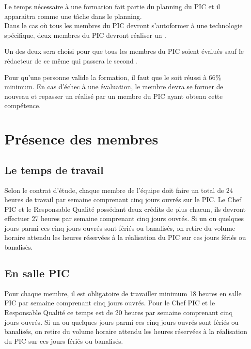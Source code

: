 Le temps nécessaire à une formation fait partie du planning du PIC et il apparaitra comme une tâche dans le planning. \\

Dans le cas où tous les membres du PIC devront s'autoformer à une technologie spécifique, deux membres du PIC devront réaliser un \QCM.

Un des deux \QCMCourt{} sera choisi pour que tous les membres du PIC soient évalués sauf le rédacteur de ce même \QCMCourt{} qui passera le second \QCMCourt.

Pour qu'une personne valide la formation, il faut que le \QCMCourt{} soit réussi à 66\% minimum. En cas d'échec à une évaluation, le membre devra se former de nouveau et repasser un \QCMCourt{} réalisé par un membre du PIC ayant obtenu cette compétence.

\section{Présence des membres}
\label{Présence des membres}

\subsection{Le temps de travail}
\label{temps_de_travail}
Selon le contrat d'étude, chaque membre de l'équipe doit faire un total de 24 heures de travail par semaine comprenant cinq jours ouvrés sur le PIC. Le Chef PIC et le Responsable Qualité possédant deux crédits de plus chacun, ils devront effectuer 27 heures par semaine comprenant cinq jours ouvrés. Si un ou quelques jours parmi ces cinq jours ouvrés sont fériés ou banalisés, on retire du volume horaire attendu les heures réservées à la réalisation du PIC sur ces jours fériés ou banalisés.

\subsection{En salle PIC}
\label{en_salle_pic}
Pour chaque membre, il est obligatoire de travailler minimum 18 heures en salle PIC par semaine comprenant cinq jours ouvrés. Pour le Chef PIC et le Responsable Qualité ce temps est de 20 heures par semaine comprenant cinq jours ouvrés. Si un ou quelques jours parmi ces cinq jours ouvrés sont fériés ou banalisés, on retire du volume horaire attendu les heures réservées à la réalisation du PIC sur ces jours fériés ou banalisés.\\

